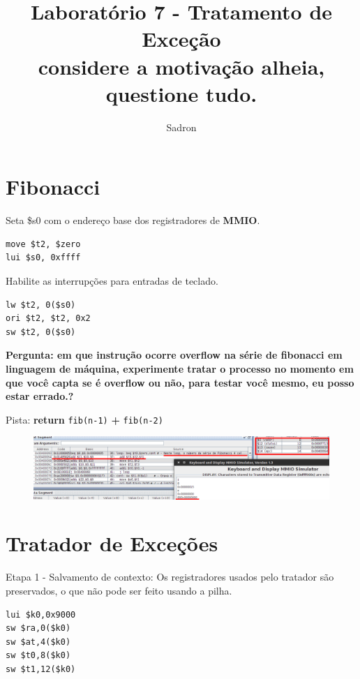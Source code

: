 \documentclass{article}
\author{Sadron}
\title{Laboratório 7 - Tratamento de Exceção\\ \small{considere a motivação
alheia, questione tudo.}}
\begin{document}
\maketitle

\section{Fibonacci}

Seta \$s0 com o endereço base dos registradores de \textbf{MMIO}.

\begin{verbatim}
move $t2, $zero
lui $s0, 0xffff
\end{verbatim}

Habilite as interrupções para entradas de teclado.

\begin{verbatim}
lw $t2, 0($s0)
ori $t2, $t2, 0x2
sw $t2, 0($s0)
\end{verbatim}

\pagebreak
{\bfseries Pergunta: em que instrução ocorre overflow na série de fibonacci em
linguagem de máquina, experimente tratar o processo no momento em que você
capta se é overflow ou não, para testar você mesmo, eu posso estar errado.?}

\begin{center}
Pista: \textbf{return} \verb|fib(n-1)| {\Huge\textbf{\color{Red} +}}
\verb|fib(n-2)|
\end{center}

\begin{figure}[ht!]
\centering
\includegraphics[scale=0.4]{overflow}
\end{figure}

\section{Tratador de Exceções}

Etapa 1 - Salvamento de contexto: Os registradores usados pelo tratador são
preservados, o que não pode ser feito usando a pilha.

\begin{verbatim}
lui $k0,0x9000
sw $ra,0($k0)
sw $at,4($k0)
sw $t0,8($k0)
sw $t1,12($k0)
\end{verbatim}
\end{document}
